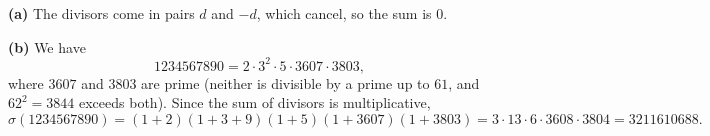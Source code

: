 \textbf{(a)} The divisors come in pairs $d$ and $-d$, which cancel, so the sum is $\boxed{0}$.

\textbf{(b)} We have
\[1234567890=2\cdot3^2\cdot5\cdot3607\cdot3803,\]
where $3607$ and $3803$ are prime (neither is divisible by a prime up to $61$, and $62^2=3844$ exceeds both). Since the sum of divisors is multiplicative,
\[\sigma(1234567890)=(1+2)(1+3+9)(1+5)(1+3607)(1+3803)=3\cdot13\cdot6\cdot3608\cdot3804=\boxed{3211610688}.\]
